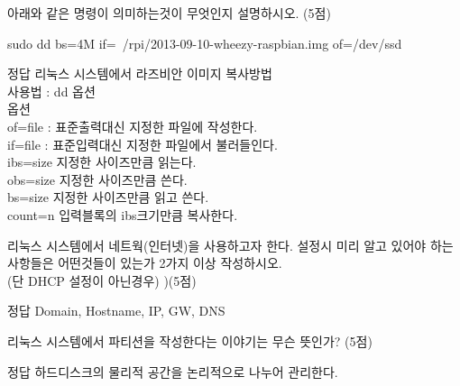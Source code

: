 \documentclass[A4paper,chapter,footnote,5pt]{oblivoir}
\begin{document}
\practice{}
\begin{Exlist}

\item 아래와 같은 명령이 의미하는것이 무엇인지 설명하시오. (5점)

sudo dd bs=4M if=~/rpi/2013-09-10-wheezy-raspbian.img of=/dev/ssd


\begin{solution}\begin{explain}
\item[정답] 리눅스 시스템에서 라즈비안 이미지 복사방법
\\사용법 : dd 옵션
\\옵션 
\\of=file : 표준출력대신 지정한 파일에 작성한다.
\\if=file : 표준입력대신 지정한 파일에서 불러들인다.
\\ibs=size 지정한 사이즈만큼 읽는다.
\\obs=size 지정한 사이즈만큼 쓴다.
\\bs=size 지정한 사이즈만큼 읽고 쓴다.
\\count=n 입력블록의 ibs크기만큼 복사한다.
\end{explain}\end{solution}


\item 리눅스 시스템에서 네트웍(인터넷)을 사용하고자 한다. 설정시 미리 알고 있어야 하는 사항들은 어떤것들이 있는가 2가지 이상 작성하시오.
\\(단 DHCP 설정이 아닌경우) )(5점)

\begin{solution}\begin{explain}
\item[정답] Domain, Hostname, IP, GW, DNS
\end{explain}\end{solution}


\item 리눅스 시스템에서 파티션을 작성한다는 이야기는 무슨 뜻인가? (5점)

\begin{solution}\begin{explain}
\item[정답] 하드디스크의 물리적 공간을 논리적으로 나누어 관리한다.
\end{explain}\end{solution}






\end{Exlist}
\end{document}

